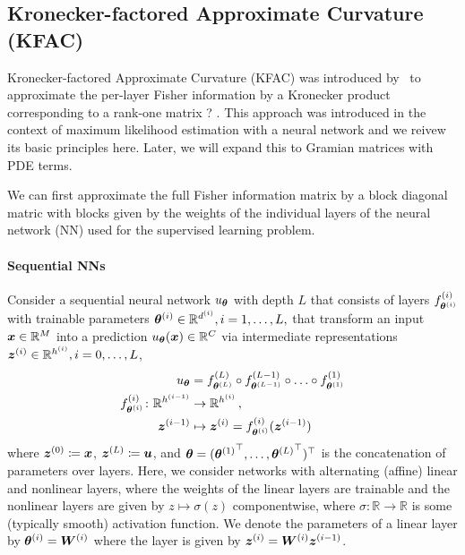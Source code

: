 \subsection{Kronecker-factored Approximate Curvature (KFAC)}


Kronecker-factored Approximate Curvature (KFAC) was introduced by~\citet{martens2015optimizing} to approximate the per-layer Fisher information by a Kronecker product corresponding to a rank-one matrix ? . 
This approach was introduced in the context of maximum likelihood estimation with a neural network and we reivew its basic principles here. 
Later, we will expand this to Gramian matrices with PDE terms. 


We can first approximate the full Fisher information matrix by a block diagonal matric with blocks given by the weights of the individual layers of the neural network (NN) used for the supervised learning problem. 

\paragraph{Sequential NNs} Consider a sequential neural network $u_{{\bm{\theta}}}$ with depth $L$ that consists of layers $f^{(i)}_{{\bm{\theta}}^{(i)}}$ with trainable parameters ${\bm{\theta}}^{(i)} \in {\mathbb{R}}^{d^{(i)}}, i=1,\dots, L,$ that transform an input ${\bm{x}} \in {\mathbb{R}}^M$ into a prediction $u_{{\bm{\theta}}}({\bm{x}})\in {\mathbb{R}}^C$ via intermediate representations ${\bm{z}}^{(i)} \in {\mathbb{R}}^{h^{(i)}}, i= 0, \dots, L$,
\begin{align}
  \begin{split}
    u_{{\bm{\theta}}}
    &=
      f^{(L)}_{{\bm{\theta}}^{(L)}} \circ f^{(L-1)}_{{\bm{\theta}}^{(L-1)}} \circ \ldots \circ f^{(1)}_{{\bm{\theta}}^{(1)}}
    \\
    f^{(i)}_{{\bm{\theta}}^{(i)}}\colon {\mathbb{R}}^{h^{(i-1)}}
    &\to
      {\mathbb{R}}^{h^{(i)}}\,,
    \\
    {\bm{z}}^{(i-1)}
    &\mapsto
      {\bm{z}}^{(i)} = f^{(i)}_{{\bm{\theta}}^{(i)}}({\bm{z}}^{(i-1)})
  \end{split}
\end{align}
where ${\bm{z}}^{(0)} \coloneqq {\bm{x}}$, ${\bm{z}}^{(L)} \coloneqq {\bm{u}}$, and ${\bm{\theta}} = ({{\bm{\theta}}^{(1)}}^{\top}, \dots, {{\bm{\theta}}^{(L)}}^{\top})^{\top}$ is the concatenation of parameters over layers.
Here, we consider networks with alternating (affine) linear and nonlinear layers, where the weights of the linear layers are trainable and the nonlinear layers are given by $z\mapsto \sigma(z)$ componentwise, where $\sigma\colon\mathbb R\to\mathbb R$ is some (typically smooth) activation function. 
We denote the parameters of a linear layer by ${\bm{\theta}}^{(i)} = {\bm{W}}^{(i)}$ where the layer is given by ${\bm{z}}^{(i)} = {\bm{W}}^{(i)} {\bm{z}}^{(i-1)}$. 


